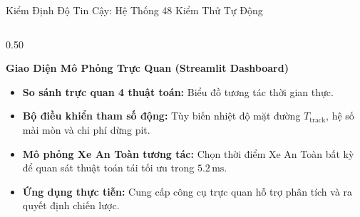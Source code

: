\documentclass[aspectratio=169, 10pt]{beamer}
\begin{document}
\begin{frame}{Kiểm Định Độ Tin Cậy: Hệ Thống 48 Kiểm Thử Tự Động}
\begin{columns}[T]
    \begin{column}{0.50\textwidth}
      \begin{exampleblock}{\textbf{Giao Diện Mô Phỏng Trực Quan (Streamlit Dashboard)}}
        \scriptsize
        \begin{itemize}
          \item \textbf{So sánh trực quan 4 thuật toán:} Biểu đồ tương tác thời gian thực.
          \item \textbf{Bộ điều khiển tham số động:} Tùy biến nhiệt độ mặt đường $T_{\text{track}}$, hệ số mài mòn và chi phí dừng pit.
          \item \textbf{Mô phỏng Xe An Toàn tương tác:} Chọn thời điểm Xe An Toàn bất kỳ để quan sát thuật toán tái tối ưu trong \textbf{$5.2\,\text{ms}$}.
          \item \textbf{Ứng dụng thực tiễn:} Cung cấp công cụ trực quan hỗ trợ phân tích và ra quyết định chiến lược.
        \end{itemize}
      \end{exampleblock}
      \vspace{0.1cm}
      \centering
    \end{column}
  \end{columns}
\end{frame}
\end{document}
